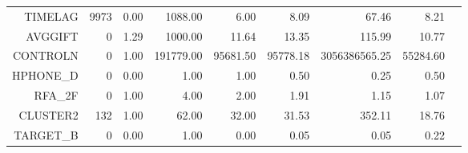 \begin{longtable}{|rrrrrrrrr|}
	TIMELAG  &  9973  &  0.00  &  1088.00  &  6.00  &  8.09  &  67.46  &  8.21 & \\
	AVGGIFT  &  0  &  1.29  &  1000.00  &  11.64  &  13.35  &  115.99  &  10.77 & \\
	CONTROLN  &  0  &  1.00  &  191779.00  &  95681.50  &  95778.18  &  3056386565.25  &  55284.60 & \\
	HPHONE\_D  &  0  &  0.00  &  1.00  &  1.00  &  0.50  &  0.25  &  0.50 & \\
	RFA\_2F  &  0  &  1.00  &  4.00  &  2.00  &  1.91  &  1.15  &  1.07 & \\
	CLUSTER2  &  132  &  1.00  &  62.00  &  32.00  &  31.53  &  352.11  &  18.76 & \\
	TARGET\_B  &  0  &  0.00  &  1.00  &  0.00  &  0.05  &  0.05  &  0.22 & \\
	\hline
\end{longtable}


